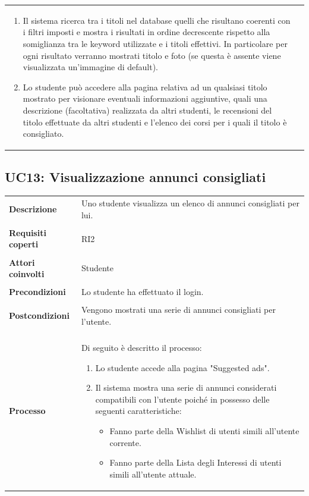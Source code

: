 \documentclass[10pt,a4paper]{report}
\begin{document}
\begin{tabular}{lp{}}
\begin{enumerate}
			\item Il sistema ricerca tra i titoli nel database quelli che risultano coerenti con i filtri imposti e mostra i risultati in ordine decrescente rispetto alla somiglianza tra le keyword utilizzate e i titoli effettivi. In particolare per ogni risultato verranno mostrati titolo e foto (se questa è assente viene visualizzata un'immagine di default).
			\item Lo studente può accedere alla pagina relativa ad un qualsiasi titolo mostrato per visionare eventuali informazioni aggiuntive, quali una descrizione (facoltativa) realizzata da altri studenti, le recensioni del titolo effettuate da altri studenti e l'elenco dei corsi per i quali il titolo è consigliato.
		\end{enumerate}
	\end{tabular}
	
	\subsection{UC13: Visualizzazione annunci consigliati}
	\begin{tabular}{lp{}}
		\textbf{Descrizione}&Uno studente visualizza un elenco di annunci consigliati per lui.\\
		\\
		\textbf{Requisiti coperti}&RI2\\
		\\
		\textbf{Attori coinvolti}&Studente\\
		\\
		\textbf{Precondizioni}&Lo studente ha effettuato il login.\\
		\\
		\textbf{Postcondizioni}&Vengono mostrati una serie di annunci consigliati per l'utente.\\
		\\
		\textbf{Processo}&Di seguito è descritto il processo:
		\begin{enumerate}
			\item Lo studente accede alla pagina "Suggested ads".
			\item Il sistema mostra una serie di annunci considerati compatibili con l'utente poiché in possesso delle seguenti caratteristiche:
			\begin{itemize}
				\item Fanno parte della Wishlist di utenti simili all'utente corrente.
				\item Fanno parte della Lista degli Interessi di utenti simili all'utente attuale.		
			\end{itemize}
		\end{enumerate}
	\end{tabular}
	
\end{document}
